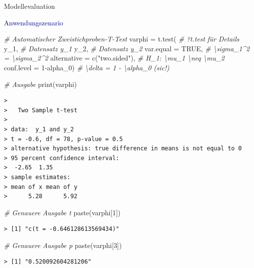 \documentclass[
  8pt,
  ignorenonframetext,
]{beamer}
\newenvironment{Shaded}{\begin{snugshade}}{\end{snugshade}}
\newcommand{\AttributeTok}[1]{\textcolor[rgb]{0.77,0.63,0.00}{#1}}
\newcommand{\CommentTok}[1]{\textcolor[rgb]{0.56,0.35,0.01}{\textit{#1}}}
\newcommand{\ConstantTok}[1]{\textcolor[rgb]{0.00,0.00,0.00}{#1}}
\newcommand{\DecValTok}[1]{\textcolor[rgb]{0.00,0.00,0.81}{#1}}
\newcommand{\FunctionTok}[1]{\textcolor[rgb]{0.00,0.00,0.00}{#1}}
\newcommand{\NormalTok}[1]{#1}
\newcommand{\OtherTok}[1]{\textcolor[rgb]{0.56,0.35,0.01}{#1}}
\newcommand{\SpecialCharTok}[1]{\textcolor[rgb]{0.00,0.00,0.00}{#1}}
\newcommand{\StringTok}[1]{\textcolor[rgb]{0.31,0.60,0.02}{#1}}
\begin{document}
\begin{frame}[fragile]{Modellevaluation}
\protect\hypertarget{modellevaluation-35}{}
\vspace{1mm}
\small

\textcolor{darkblue}{Anwendungszenario} \vspace{1mm} 
\tiny

\begin{Shaded}
\begin{Highlighting}[]
\CommentTok{\# Automatischer Zweistichproben{-}T{-}Test}
\NormalTok{varphi    }\OtherTok{=} \FunctionTok{t.test}\NormalTok{(                           }\CommentTok{\# ?t.test für Details}
\NormalTok{            y\_1,                              }\CommentTok{\# Datensatz y\_1}
\NormalTok{            y\_2,                              }\CommentTok{\# Datensatz y\_2}
            \AttributeTok{var.equal   =} \ConstantTok{TRUE}\NormalTok{,               }\CommentTok{\# \textbackslash{}sigma\_1\^{}2 = \textbackslash{}sigma\_2\^{}2}
            \AttributeTok{alternative =} \FunctionTok{c}\NormalTok{(}\StringTok{"two.sided"}\NormalTok{),     }\CommentTok{\# H\_1: \textbackslash{}mu\_1 \textbackslash{}neq \textbackslash{}mu\_2}
            \AttributeTok{conf.level  =} \DecValTok{1}\SpecialCharTok{{-}}\NormalTok{alpha\_0)          }\CommentTok{\# \textbackslash{}delta = 1 {-} \textbackslash{}alpha\_0 (sic!)}

\CommentTok{\# Ausgabe}
\FunctionTok{print}\NormalTok{(varphi)}
\end{Highlighting}
\end{Shaded}

\begin{verbatim}
> 
>   Two Sample t-test
> 
> data:  y_1 and y_2
> t = -0.6, df = 78, p-value = 0.5
> alternative hypothesis: true difference in means is not equal to 0
> 95 percent confidence interval:
>  -2.65  1.35
> sample estimates:
> mean of x mean of y 
>      5.28      5.92
\end{verbatim}

\begin{Shaded}
\begin{Highlighting}[]
\CommentTok{\# Genauere Ausgabe t}
\FunctionTok{paste}\NormalTok{(varphi[}\DecValTok{1}\NormalTok{])}
\end{Highlighting}
\end{Shaded}

\begin{verbatim}
> [1] "c(t = -0.646128613569434)"
\end{verbatim}

\begin{Shaded}
\begin{Highlighting}[]
\CommentTok{\# Genauere Ausgabe p}
\FunctionTok{paste}\NormalTok{(varphi[}\DecValTok{3}\NormalTok{])}
\end{Highlighting}
\end{Shaded}

\begin{verbatim}
> [1] "0.520092604281206"
\end{verbatim}
\end{frame}
\end{document}
